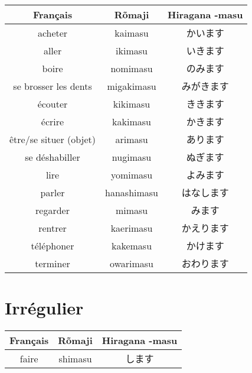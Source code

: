 \documentclass[11pt]{report}
\newenvironment{Japanese}{%
\CJKfamily{min}%
\CJKtilde  
\CJKnospace}{}
\begin{document}
\begin{CJK}{UTF8}{}  
\begin{Japanese}
	\begin{center}
		\begin{tabular}{|c|c|c|}
				\hline
				\textbf{Français} & \textbf{Rõmaji} & \textbf{Hiragana -masu} \\
				\hline
				acheter & kaimasu & かいます \\
				\hline
				aller & ikimasu & いきます \\
				\hline
				boire & nomimasu & のみます \\
				\hline
				se brosser les dents & migakimasu & みがきます \\
				\hline
				écouter & kikimasu & ききます \\
				\hline
				écrire & kakimasu & かきます \\
				\hline
				être/se situer (objet) & arimasu & あります \\
				\hline
				se déshabiller & nugimasu & ぬぎます \\
				\hline
				lire & yomimasu & よみます \\
				\hline
				parler & hanashimasu & はなします \\
				\hline
				regarder & mimasu & みます \\
				\hline
				rentrer & kaerimasu & かえります \\
				\hline
				téléphoner & kakemasu & かけます \\
				\hline
				terminer & owarimasu & おわります \\
				\hline
			\end{tabular}
	\end{center}
\end{Japanese}  
\end{CJK}

\chapter{Irrégulier}

\begin{CJK}{UTF8}{}  
\begin{Japanese}
	\begin{center}
		\begin{tabular}{|c|c|c|}
				\hline
				\textbf{Français} & \textbf{Rõmaji} & \textbf{Hiragana -masu} \\
				\hline
				faire & shimasu & します \\
				\hline
			\end{tabular}
	\end{center}
\end{Japanese}  
\end{CJK}
\end{document}

